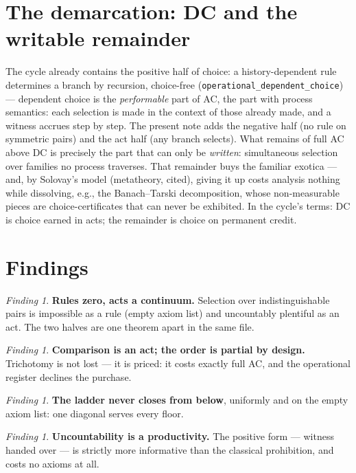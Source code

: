 \documentclass[11pt]{article}
\theoremstyle{remark}
\newtheorem{finding}[thm]{Finding}
\begin{document}
\section{The demarcation: DC and the writable remainder}
\label{sec:dc}

The cycle already contains the positive half of choice: a
history-dependent rule determines a branch by recursion, choice-free
(\texttt{operational\_dependent\_choice}) --- dependent choice is the
\emph{performable} part of AC, the part with process semantics: each
selection is made in the context of those already made, and a witness
accrues step by step.  The present note adds the negative half (no rule
on symmetric pairs) and the act half (any branch selects).  What remains
of full AC above DC is precisely the part that can only be
\emph{written}: simultaneous selection over families no process
traverses.  That remainder buys the familiar exotica --- and, by
Solovay's model (metatheory, cited), giving it up costs analysis nothing
while dissolving, e.g., the Banach--Tarski decomposition, whose
non-measurable pieces are choice-certificates that can never be
exhibited.  In the cycle's terms: DC is choice earned in acts; the
remainder is choice on permanent credit.

\section{Findings}

\begin{finding}
\textbf{Rules zero, acts a continuum.}  Selection over
indistinguishable pairs is impossible as a rule (empty axiom list) and
uncountably plentiful as an act.  The two halves are one theorem apart
in the same file.
\end{finding}

\begin{finding}
\textbf{Comparison is an act; the order is partial by design.}
Trichotomy is not lost --- it is priced: it costs exactly full AC, and
the operational register declines the purchase.
\end{finding}

\begin{finding}
\textbf{The ladder never closes from below}, uniformly and on the empty
axiom list: one diagonal serves every floor.
\end{finding}

\begin{finding}
\textbf{Uncountability is a productivity.}  The positive form ---
witness handed over --- is strictly more informative than the classical
prohibition, and costs no axioms at all.
\end{finding}
\end{document}
